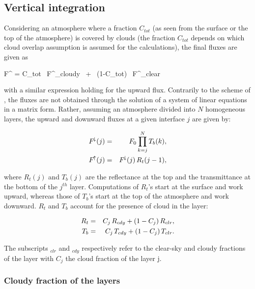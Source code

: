 %
\subsection{Vertical integration}
%

Considering an atmosphere where a fraction $C_{tot}$ (as seen from the surface or the top of the atmosphere) is covered by clouds (the fraction $C_{tot}$ depends on which cloud overlap assumption is assumed for the calculations), the final fluxes are given as

\medskip
\be
F^{\!\downarrow} = C_{tot} \, F^{\!\downarrow}_{cloudy} \, + \, (1-C_{tot}) \, F^{\!\downarrow}_{clear}
\label{ecmwf3110}
\ee
\medskip

\noindent with a similar expression holding for the upward flux. Contrarily to
the scheme of \citet{Geleyn1979}, the fluxes are not obtained
through the solution of a system of linear equations in a matrix form. Rather,
assuming an atmosphere divided into $N$ homogeneous layers, the upward and
downward fluxes at a given interface $j$ are given by:

\medskip
\begin{eqnarray}\label{ecmwf312}
F^{\!\downarrow}(j)&=&  F_0 \prod_{k=j}^N{T_b(k)}, \cr
F^{\!\uparrow}(j)  &=&  F^{\!\downarrow}(j) \, R_t(j-1),
\end{eqnarray}
\medskip

\noindent where $R_t(j)$ and $T_b(j)$ are the reflectance at the top and the
transmittance at the bottom of the $j^{th}$ layer. Computations of $R_t$'s
start at the surface and work upward, whereas those of $T_b$'s start at the top
of the atmosphere and work downward. $R_t$ and $T_b$ account for the presence of
cloud in the layer:

\medskip
\begin{eqnarray}\label{ecmwf313}
R_t &=& C_j \, R_{cdy} + (1 - C_j) \, R_{clr}, \cr
T_b &=& C_j \, T_{cdy} + (1 - C_j) \, T_{clr}.
\end{eqnarray}
\medskip

The subscripts $_{clr}$ and $_{cdy}$ respectively refer to the clear-sky and
cloudy fractions of the layer with $C_j$ the cloud fraction of the layer j.\\


%
\subsubsection{Cloudy fraction of the layers}
\label{subsubsection321}
%

